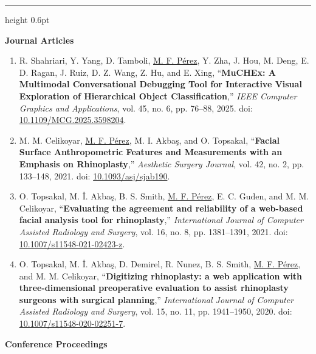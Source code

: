 \documentclass[11pt,letterpaper]{article}
\newcommand{\cvsection}[1]{\par\addvspace{11pt}\Needspace{5\baselineskip}{\fontsize{12}{14}\selectfont\textbf{\MakeUppercase{#1}}}\par\nobreak\vspace{2pt}\hrule height 0.6pt\nobreak\vspace{5pt}}
\newcommand{\cvsubsection}[1]{\par\addvspace{7pt}\Needspace{4\baselineskip}\textbf{#1}\par\nobreak\vspace{1pt}}
\newcommand{\pubtitle}[1]{\textbf{#1}}
\newcommand{\me}{\underline{M. F. Pérez}}
\begin{document}
\cvsection{Publications}
\cvsubsection{Journal Articles}
\begin{enumerate}
\item R. Shahriari, Y. Yang, D. Tamboli, \me, Y. Zha, J. Hou, M. Deng, E. D. Ragan, J. Ruiz, D. Z. Wang, Z. Hu, and E. Xing, ``\pubtitle{MuCHEx: A Multimodal Conversational Debugging Tool for Interactive Visual Exploration of Hierarchical Object Classification},'' \textit{IEEE Computer Graphics and Applications}, vol. 45, no. 6, pp. 76–88, 2025. doi: \href{https://doi.org/10.1109/MCG.2025.3598204}{10.1109/MCG.2025.3598204}.
\item M. M. Celikoyar, \me, M. I. Akbaş, and O. Topsakal, ``\pubtitle{Facial Surface Anthropometric Features and Measurements with an Emphasis on Rhinoplasty},'' \textit{Aesthetic Surgery Journal}, vol. 42, no. 2, pp. 133–148, 2021. doi: \href{https://doi.org/10.1093/asj/sjab190}{10.1093/asj/sjab190}.
\item O. Topsakal, M. İ. Akbaş, B. S. Smith, \me, E. C. Guden, and M. M. Celikoyar, ``\pubtitle{Evaluating the agreement and reliability of a web-based facial analysis tool for rhinoplasty},'' \textit{International Journal of Computer Assisted Radiology and Surgery}, vol. 16, no. 8, pp. 1381–1391, 2021. doi: \href{https://doi.org/10.1007/s11548-021-02423-z}{10.1007/s11548-021-02423-z}.
\item O. Topsakal, M. İ. Akbaş, D. Demirel, R. Nunez, B. S. Smith, \me, and M. M. Celikoyar, ``\pubtitle{Digitizing rhinoplasty: a web application with three-dimensional preoperative evaluation to assist rhinoplasty surgeons with surgical planning},'' \textit{International Journal of Computer Assisted Radiology and Surgery}, vol. 15, no. 11, pp. 1941–1950, 2020. doi: \href{https://doi.org/10.1007/s11548-020-02251-7}{10.1007/s11548-020-02251-7}.
\end{enumerate}
\cvsubsection{Conference Proceedings}
\end{document}
